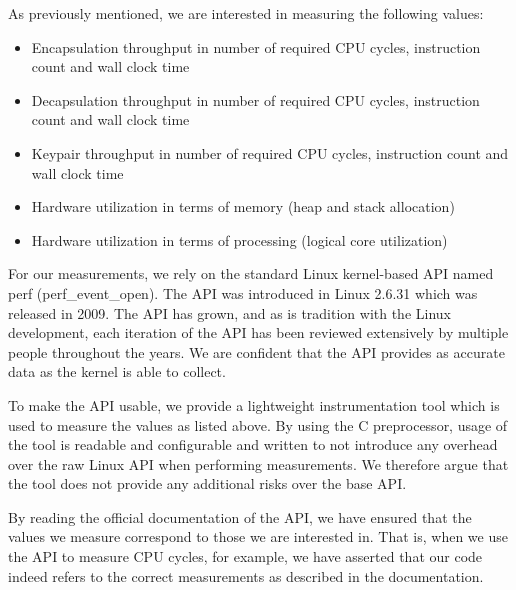 

As previously mentioned, we are interested in measuring the following values:

\begin{itemize}
    \item Encapsulation throughput in number of required CPU cycles, instruction count and wall clock time
    \item Decapsulation throughput in number of required CPU cycles, instruction count and wall clock time
    \item Keypair throughput in number of required CPU cycles, instruction count and wall clock time
    \item Hardware utilization in terms of memory (heap and stack allocation)
    \item Hardware utilization in terms of processing (logical core utilization)
\end{itemize}

For our measurements, we rely on the standard Linux kernel-based API named perf (perf\_event\_open). The API was introduced in Linux 2.6.31 which was released in 2009. The API has grown, and as is tradition with the Linux development, each iteration of the API has been reviewed extensively by multiple people throughout the years. We are confident that the API provides as accurate data as the kernel is able to collect.

To make the API usable, we provide a lightweight instrumentation tool which is used to measure the values as listed above. By using the C preprocessor, usage of the tool is readable and configurable and written to not introduce any overhead over the raw Linux API when performing measurements. We therefore argue that the tool does not provide any additional risks over the base API.

By reading the official documentation of the API, we have ensured that the values we measure correspond to those we are interested in. That is, when we use the API to measure CPU cycles, for example, we have asserted that our code indeed refers to the correct measurements as described in the documentation.

